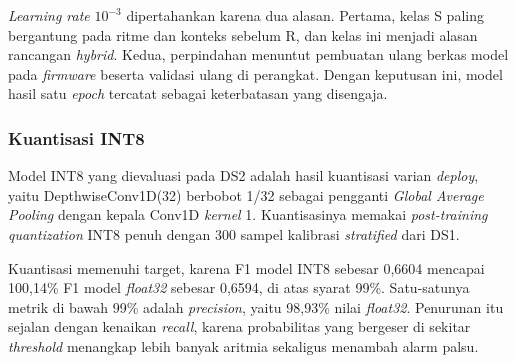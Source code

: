 \textit{Learning rate} $10^{-3}$ dipertahankan karena dua alasan. Pertama, kelas S paling bergantung pada ritme dan konteks sebelum R, dan kelas ini menjadi alasan rancangan \textit{hybrid}. Kedua, perpindahan menuntut pembuatan ulang berkas model pada \textit{firmware} beserta validasi ulang di perangkat. Dengan keputusan ini, model hasil satu \textit{epoch} tercatat sebagai keterbatasan yang disengaja.

\subsubsection{Kuantisasi INT8}

Model INT8 yang dievaluasi pada DS2 adalah hasil kuantisasi varian \textit{deploy}, yaitu DepthwiseConv1D(32) berbobot 1/32 sebagai pengganti \textit{Global Average Pooling} dengan kepala Conv1D \textit{kernel} 1. Kuantisasinya memakai \textit{post-training quantization} INT8 penuh dengan 300 sampel kalibrasi \textit{stratified} dari DS1.

Kuantisasi memenuhi target, karena F1 model INT8 sebesar 0,6604 mencapai 100,14\% F1 model \textit{float32} sebesar 0,6594, di atas syarat 99\%. Satu-satunya metrik di bawah 99\% adalah \textit{precision}, yaitu 98,93\% nilai \textit{float32}. Penurunan itu sejalan dengan kenaikan \textit{recall}, karena probabilitas yang bergeser di sekitar \textit{threshold} menangkap lebih banyak aritmia sekaligus menambah alarm palsu.

